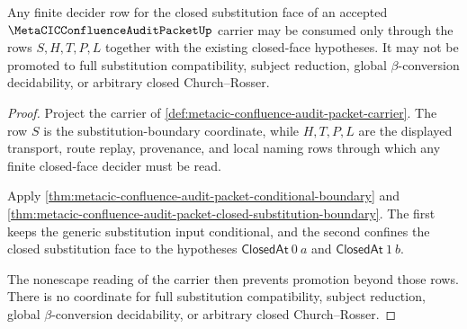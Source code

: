 \begin{theorem}
\label{thm:metacic-confluence-audit-closed-face-decider-boundary}
Any finite decider row for the closed substitution face of an accepted
$\MetaCICConfluenceAuditPacketUp$ carrier may be consumed only through the rows
$S,H,T,P,L$ together with the existing closed-face hypotheses. It may not be
promoted to full substitution compatibility, subject reduction, global
$\beta$-conversion decidability, or arbitrary closed Church--Rosser.
\end{theorem}
\begin{proof}
Project the carrier of
\autoref{def:metacic-confluence-audit-packet-carrier}. The row $S$ is the
substitution-boundary coordinate, while $H,T,P,L$ are the displayed transport,
route replay, provenance, and local naming rows through which any finite
closed-face decider must be read.

Apply \autoref{thm:metacic-confluence-audit-packet-conditional-boundary} and
\autoref{thm:metacic-confluence-audit-packet-closed-substitution-boundary}. The
first keeps the generic substitution input conditional, and the second confines
the closed substitution face to the hypotheses $\mathsf{ClosedAt}\ 0\ a$ and
$\mathsf{ClosedAt}\ 1\ b$.

The nonescape reading of the carrier then prevents promotion beyond those rows.
There is no coordinate for full substitution compatibility, subject reduction,
global $\beta$-conversion decidability, or arbitrary closed Church--Rosser.
\end{proof}

